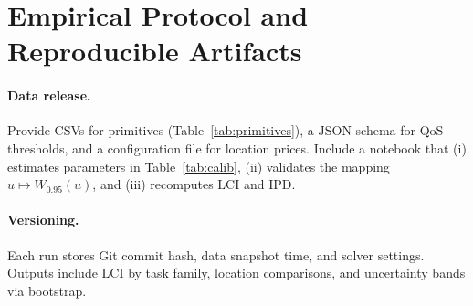 \documentclass[12pt]{article}
\numberwithin{equation}{section}
\theoremstyle{definition}
\theoremstyle{plain}
\newcommand{\LCI}{\mathrm{LCI}}
\newcommand{\IPD}{\mathrm{IPD}}
\begin{document}
\section{Empirical Protocol and Reproducible Artifacts}\label{app:empirical}
\paragraph{Data release.}
Provide CSVs for primitives (Table~\ref{tab:primitives}), a JSON schema for QoS thresholds, and a configuration file for location prices. Include a notebook that (i) estimates parameters in Table~\ref{tab:calib}, (ii) validates the mapping $u\mapsto W_{0.95}(u)$, and (iii) recomputes $\LCI$ and $\IPD$.

\paragraph{Versioning.}
Each run stores Git commit hash, data snapshot time, and solver settings. Outputs include $\LCI$ by task family, location comparisons, and uncertainty bands via bootstrap.
\end{document}
